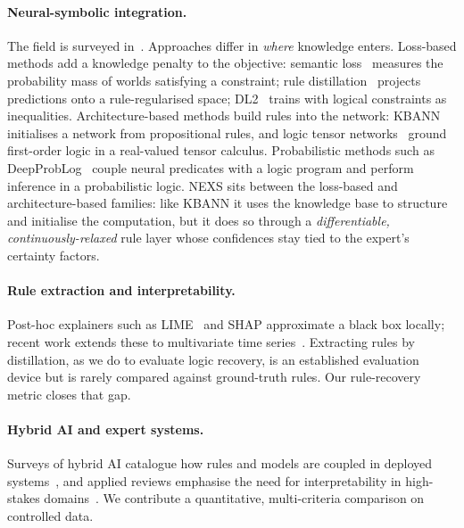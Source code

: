 \documentclass[11pt]{article}
\newcommand{\nexs}{\textsc{NEXS}}
\begin{document}
\paragraph{Neural-symbolic integration.}
The field is surveyed in~\cite{besold2017neural,garcez2019neural,lamb2020graph,marra2021statistical}.
Approaches differ in \emph{where} knowledge enters. Loss-based methods add a
knowledge penalty to the objective: semantic loss~\cite{xu2018semantic} measures
the probability mass of worlds satisfying a constraint; rule
distillation~\cite{hu2016harnessing} projects predictions onto a rule-regularised
space; DL2~\cite{fischer2019dl2} trains with logical constraints as inequalities.
Architecture-based methods build rules into the network:
KBANN~\cite{towell1994kbann} initialises a network from propositional rules, and
logic tensor networks~\cite{badreddine2022logic} ground first-order logic in a
real-valued tensor calculus. Probabilistic methods such as
DeepProbLog~\cite{manhaeve2018deepproblog} couple neural predicates with a logic
program and perform inference in a probabilistic logic. \nexs{} sits between the
loss-based and architecture-based families: like KBANN it uses the knowledge base
to structure and initialise the computation, but it does so through a
\emph{differentiable, continuously-relaxed} rule layer whose confidences stay
tied to the expert's certainty factors.

\paragraph{Rule extraction and interpretability.}
Post-hoc explainers such as LIME~\cite{ribeiro2016why} and SHAP approximate a
black box locally; recent work extends these to multivariate time
series~\cite{southam2026gradientshap}. Extracting rules by distillation, as we do to
evaluate logic recovery, is an established evaluation device but is rarely
compared against ground-truth rules. Our rule-recovery metric closes that gap.

\paragraph{Hybrid AI and expert systems.}
Surveys of hybrid AI catalogue how rules and models are coupled in deployed
systems~\cite{ruddle2026hybrid}, and applied reviews emphasise the need for
interpretability in high-stakes domains~\cite{dash2022survey}. We contribute a
quantitative, multi-criteria comparison on controlled data.
\end{document}
